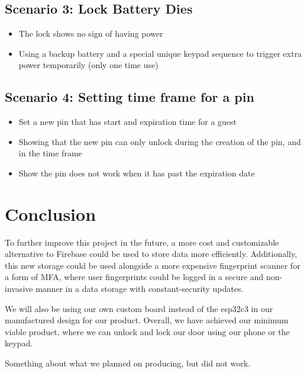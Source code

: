 \documentclass[12pt]{article}
\begin{document}
\subsection{Scenario 3: Lock Battery Dies}
\begin{itemize}
    \item The lock shows no sign of having power
    \item Using a backup battery and a special unique keypad sequence to trigger extra power temporarily (only one time use)
\end{itemize}

\subsection{Scenario 4: Setting time frame for a pin}
\begin{itemize}
    \item Set a new pin that has start and expiration time for a guest
    \item Showing that the new pin can only unlock during the creation of the pin, and in the time frame
    \item Show the pin does not work when it has past the expiration date
\end{itemize}

\pagebreak
\section{Conclusion}
To further improve this project in the future, a more cost and customizable alternative to Firebase could be used to store data more efficiently. Additionally, this new storage could be used alongside a more expensive fingerprint scanner for a form of MFA, where user fingerprints could be logged in a secure and non-invasive manner in a data storage with constant-security updates.

We will also be using our own custom board instead of the esp32c3 in our manufactured design for our product. Overall, we have achieved our minimum viable product, where we can unlock and lock our door using our phone or the keypad.

Something about what we planned on producing, but did not work.
\end{document}
